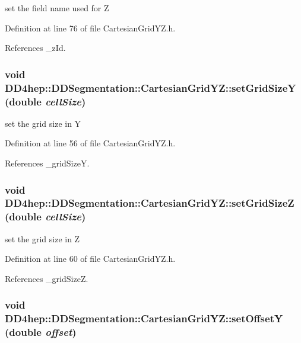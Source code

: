set the field name used for Z 

Definition at line 76 of file CartesianGridYZ.h.

References \_\-zId.\hypertarget{class_d_d4hep_1_1_d_d_segmentation_1_1_cartesian_grid_y_z_a0062b881400bc655da7f75720d27af7b}{
\subsubsection[{setGridSizeY}]{\setlength{\rightskip}{0pt plus 5cm}void DD4hep::DDSegmentation::CartesianGridYZ::setGridSizeY (double {\em cellSize})}}
\label{class_d_d4hep_1_1_d_d_segmentation_1_1_cartesian_grid_y_z_a0062b881400bc655da7f75720d27af7b}


set the grid size in Y 

Definition at line 56 of file CartesianGridYZ.h.

References \_\-gridSizeY.\hypertarget{class_d_d4hep_1_1_d_d_segmentation_1_1_cartesian_grid_y_z_a96633e1fe0220512513a35ad41136b6d}{
\subsubsection[{setGridSizeZ}]{\setlength{\rightskip}{0pt plus 5cm}void DD4hep::DDSegmentation::CartesianGridYZ::setGridSizeZ (double {\em cellSize})}}
\label{class_d_d4hep_1_1_d_d_segmentation_1_1_cartesian_grid_y_z_a96633e1fe0220512513a35ad41136b6d}


set the grid size in Z 

Definition at line 60 of file CartesianGridYZ.h.

References \_\-gridSizeZ.\hypertarget{class_d_d4hep_1_1_d_d_segmentation_1_1_cartesian_grid_y_z_acc72b1c4ab17cebf45e596f6afaf5f2e}{
\subsubsection[{setOffsetY}]{\setlength{\rightskip}{0pt plus 5cm}void DD4hep::DDSegmentation::CartesianGridYZ::setOffsetY (double {\em offset})}}
\label{class_d_d4hep_1_1_d_d_segmentation_1_1_cartesian_grid_y_z_acc72b1c4ab17cebf45e596f6afaf5f2e}


